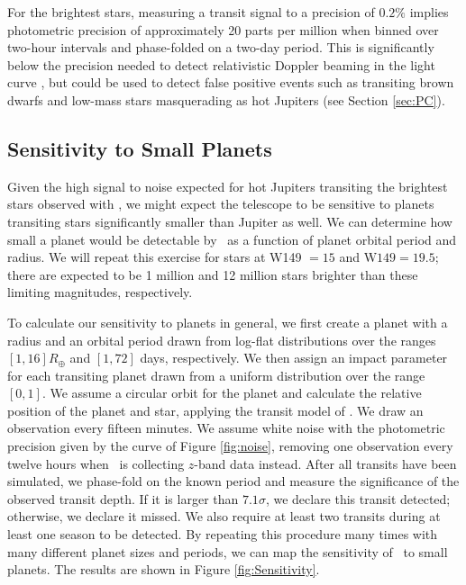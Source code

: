 For the brightest stars, measuring a transit signal to a precision of 
$0.2\%$ implies photometric precision of approximately 20 parts per million
when binned over two-hour intervals and phase-folded on a two-day period.
This is significantly below the precision needed to detect relativistic Doppler
beaming in the light curve \citep{Loeb03, Faigler11}, but could be used to detect
false positive events such as transiting brown dwarfs and low-mass stars masquerading
as hot Jupiters (see Section \ref{sec:PC}).


\subsection{Sensitivity to Small Planets}
\label{sec:small}

Given the high signal to noise expected for hot Jupiters transiting the brightest stars
observed with \WF, we might expect the telescope to be sensitive to planets transiting
stars significantly smaller than Jupiter as well.
We can determine how small a planet would be detectable by \WF\ as a function of planet
orbital period and radius. 
We will repeat this exercise for stars at W149 $= 15$ and $\textrm{W149} = 19.5$; there are 
expected to be 1 million and 12 million stars brighter than these limiting magnitudes,
respectively.

To calculate our sensitivity to planets in general, we first create a planet with a radius and an orbital
period drawn from log-flat distributions over the ranges $[1, 16]R_{\oplus}$ and $[1,72]$ days, respectively. We then assign an impact parameter for each
transiting planet drawn from
a uniform distribution over the range $[0, 1]$. 
We assume a circular orbit for the planet and calculate the relative position of the 
planet and star, applying the transit model of \citet{Mandel02}.
We draw an observation every fifteen minutes.
We assume white noise with the photometric
precision given by the \citet{Gould15} curve of Figure \ref{fig:noise}, removing one observation every twelve hours
when \WF\ is collecting $z$-band data instead.
After all transits have been simulated, we phase-fold on the known period and measure
the significance of the observed transit depth. 
If it is larger than $7.1\sigma$, we declare this transit detected; otherwise, we declare
it missed.
We also require at least two transits during at least one season to be detected.
By repeating this procedure many times with many different planet sizes and periods,
we can map the sensitivity of \WF\ to small planets. The results are shown in Figure
\ref{fig:Sensitivity}.

